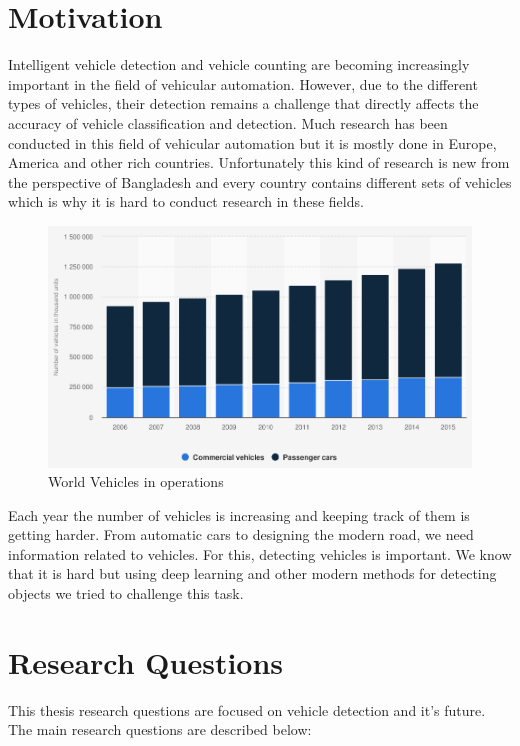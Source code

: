 \section{Motivation}
Intelligent vehicle detection and vehicle counting are becoming increasingly important in the field of vehicular automation. However, due to the different types of vehicles, their detection remains a challenge that directly affects the accuracy of vehicle classification and detection. Much research has been conducted in this field of vehicular automation but it is mostly done in Europe, America and  other rich countries. Unfortunately this kind of research is new from the perspective of Bangladesh and every country contains different sets of vehicles which is why it is hard to conduct research in these fields. 
\begin{figure}[ht]
    \centering
    \includegraphics[max width=\textwidth]{images/ours/statistic_id281134_number-of-vehicles-in-use-worldwide-2006-2015.png}
   \caption[World Vehicles in operations]{ World Vehicles in operations \cite{vehicleinoperation}}
    \label{fig:world_vehicle_stat}
\end{figure}
Each year the number of vehicles is increasing and keeping track of them is getting harder. From automatic cars to designing the modern road, we need information related to vehicles. For this, detecting vehicles is important. We know that it is hard but using deep learning and other modern methods for detecting objects we tried to challenge this task. 

\newpage

\section{Research Questions}
This thesis research questions are focused on vehicle detection and it's future. The main research questions are described below:

